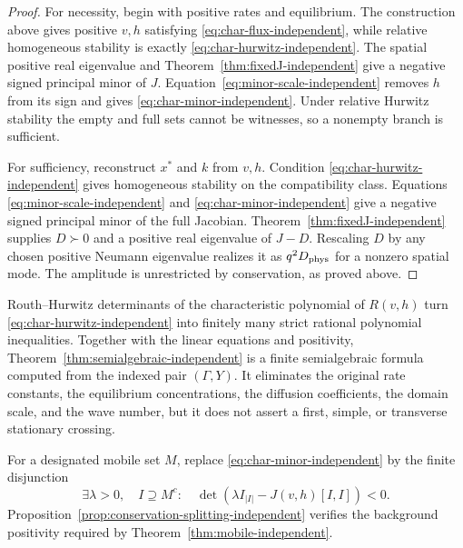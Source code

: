 \begin{proof}
For necessity, begin with positive rates and equilibrium.  The construction
above gives positive $v,h$ satisfying \eqref{eq:char-flux-independent}, while
relative homogeneous stability is exactly
\eqref{eq:char-hurwitz-independent}.  The spatial positive real eigenvalue and
Theorem~\ref{thm:fixedJ-independent} give a negative signed principal minor of
$J$.  Equation~\eqref{eq:minor-scale-independent} removes $h$ from its sign and
gives \eqref{eq:char-minor-independent}.  Under relative Hurwitz stability the
empty and full sets cannot be witnesses, so a nonempty branch is sufficient.

For sufficiency, reconstruct $x^*$ and $k$ from $v,h$.  Condition
\eqref{eq:char-hurwitz-independent} gives homogeneous stability on the
compatibility class.  Equations \eqref{eq:minor-scale-independent} and
\eqref{eq:char-minor-independent} give a negative signed principal minor of the
full Jacobian.  Theorem~\ref{thm:fixedJ-independent} supplies $D\succ0$ and a
positive real eigenvalue of $J-D$.  Rescaling $D$ by any chosen positive
Neumann eigenvalue realizes it as $q^2D_{\rm phys}$ for a nonzero spatial mode.
The amplitude is unrestricted by conservation, as proved above.
\end{proof}

Routh--Hurwitz determinants of the characteristic polynomial of $R(v,h)$ turn
\eqref{eq:char-hurwitz-independent} into finitely many strict rational
polynomial inequalities.  Together with the linear equations and positivity,
Theorem~\ref{thm:semialgebraic-independent} is a finite semialgebraic formula
computed from the indexed pair $(\Gamma,Y)$.  It eliminates the original rate
constants, the equilibrium concentrations, the diffusion coefficients, the
domain scale, and the wave number, but it does not assert a first, simple, or
transverse stationary crossing.

For a designated mobile set $M$, replace
\eqref{eq:char-minor-independent} by the finite disjunction
\[
 \exists\lambda>0,\quad I\supseteq M^c:\quad
 \det(\lambda I_{|I|}-J(v,h)[I,I])<0.
\]
Proposition~\ref{prop:conservation-splitting-independent} verifies the
background positivity required by Theorem~\ref{thm:mobile-independent}.
